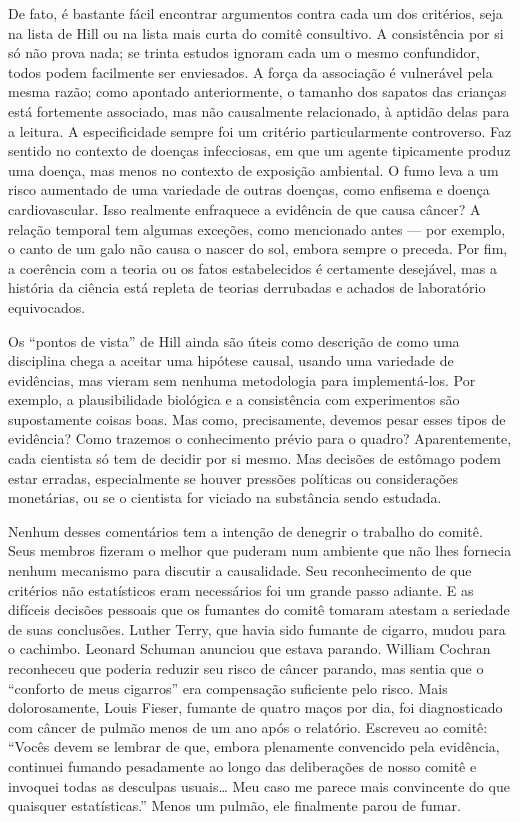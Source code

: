 \documentclass[11pt,a5paper,twoside]{book}
\begin{document}
De fato, é bastante fácil encontrar argumentos contra cada um dos critérios, seja na lista de Hill ou na lista mais curta do comitê consultivo. A consistência por si só não prova nada; se trinta estudos ignoram cada um o mesmo confundidor, todos podem facilmente ser enviesados. A força da associação é vulnerável pela mesma razão; como apontado anteriormente, o tamanho dos sapatos das crianças está fortemente associado, mas não causalmente relacionado, à aptidão delas para a leitura. A especificidade sempre foi um critério particularmente controverso. Faz sentido no contexto de doenças infecciosas, em que um agente tipicamente produz uma doença, mas menos no contexto de exposição ambiental. O fumo leva a um risco aumentado de uma variedade de outras doenças, como enfisema e doença cardiovascular. Isso realmente enfraquece a evidência de que causa câncer? A relação temporal tem algumas exceções, como mencionado antes — por exemplo, o canto de um galo não causa o nascer do sol, embora sempre o preceda. Por fim, a coerência com a teoria ou os fatos estabelecidos é certamente desejável, mas a história da ciência está repleta de teorias derrubadas e achados de laboratório equivocados.

Os “pontos de vista” de Hill ainda são úteis como descrição de como uma disciplina chega a aceitar uma hipótese causal, usando uma variedade de evidências, mas vieram sem nenhuma metodologia para implementá-los. Por exemplo, a plausibilidade biológica e a consistência com experimentos são supostamente coisas boas. Mas como, precisamente, devemos pesar esses tipos de evidência? Como trazemos o conhecimento prévio para o quadro? Aparentemente, cada cientista só tem de decidir por si mesmo. Mas decisões de estômago podem estar erradas, especialmente se houver pressões políticas ou considerações monetárias, ou se o cientista for viciado na substância sendo estudada.

Nenhum desses comentários tem a intenção de denegrir o trabalho do comitê. Seus membros fizeram o melhor que puderam num ambiente que não lhes fornecia nenhum mecanismo para discutir a causalidade. Seu reconhecimento de que critérios não estatísticos eram necessários foi um grande passo adiante. E as difíceis decisões pessoais que os fumantes do comitê tomaram atestam a seriedade de suas conclusões. Luther Terry, que havia sido fumante de cigarro, mudou para o cachimbo. Leonard Schuman anunciou que estava parando. William Cochran reconheceu que poderia reduzir seu risco de câncer parando, mas sentia que o “conforto de meus cigarros” era compensação suficiente pelo risco. Mais dolorosamente, Louis Fieser, fumante de quatro maços por dia, foi diagnosticado com câncer de pulmão menos de um ano após o relatório. Escreveu ao comitê: “Vocês devem se lembrar de que, embora plenamente convencido pela evidência, continuei fumando pesadamente ao longo das deliberações de nosso comitê e invoquei todas as desculpas usuais… Meu caso me parece mais convincente do que quaisquer estatísticas.” Menos um pulmão, ele finalmente parou de fumar.
\end{document}
